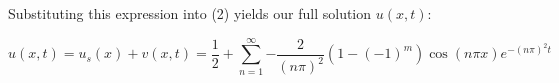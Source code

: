 \begin{solution}
    Substituting this expression into (2) yields our full solution $u(x, t)$:
    
    $$
    u(x, t) = u_s(x) + v(x, t) 
            = \frac{1}{2} + \sum\limits_{n=1}^{\infty}{-\frac{2}{(n \pi)^2} \left(1 - (-1)^{m}\right) \cos{(n \pi x)} e^{-(n \pi)^2 t}}
    $$





    \ \\
\end{solution}